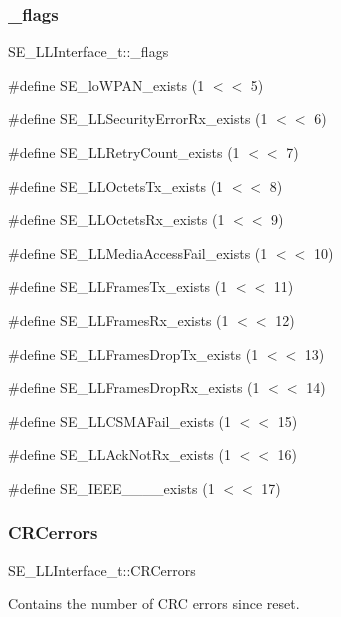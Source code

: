 \subsubsection{\texorpdfstring{\+\_\+flags}{\_flags}}
{\footnotesize\ttfamily S\+E\+\_\+\+L\+L\+Interface\+\_\+t\+::\+\_\+flags}

\#define S\+E\+\_\+lo\+W\+P\+A\+N\+\_\+exists (1 $<$$<$ 5)

\#define S\+E\+\_\+\+L\+L\+Security\+Error\+Rx\+\_\+exists (1 $<$$<$ 6)

\#define S\+E\+\_\+\+L\+L\+Retry\+Count\+\_\+exists (1 $<$$<$ 7)

\#define S\+E\+\_\+\+L\+L\+Octets\+Tx\+\_\+exists (1 $<$$<$ 8)

\#define S\+E\+\_\+\+L\+L\+Octets\+Rx\+\_\+exists (1 $<$$<$ 9)

\#define S\+E\+\_\+\+L\+L\+Media\+Access\+Fail\+\_\+exists (1 $<$$<$ 10)

\#define S\+E\+\_\+\+L\+L\+Frames\+Tx\+\_\+exists (1 $<$$<$ 11)

\#define S\+E\+\_\+\+L\+L\+Frames\+Rx\+\_\+exists (1 $<$$<$ 12)

\#define S\+E\+\_\+\+L\+L\+Frames\+Drop\+Tx\+\_\+exists (1 $<$$<$ 13)

\#define S\+E\+\_\+\+L\+L\+Frames\+Drop\+Rx\+\_\+exists (1 $<$$<$ 14)

\#define S\+E\+\_\+\+L\+L\+C\+S\+M\+A\+Fail\+\_\+exists (1 $<$$<$ 15)

\#define S\+E\+\_\+\+L\+L\+Ack\+Not\+Rx\+\_\+exists (1 $<$$<$ 16)

\#define S\+E\+\_\+\+I\+E\+E\+E\+\_\+\_\+\_\+\_\+exists (1 $<$$<$ 17) \mbox{\label{group__LLInterface_gae30861c0bcee76e4fb3d6595c0627ee4}} 
\subsubsection{\texorpdfstring{C\+R\+Cerrors}{CRCerrors}}
{\footnotesize\ttfamily S\+E\+\_\+\+L\+L\+Interface\+\_\+t\+::\+C\+R\+Cerrors}

Contains the number of C\+RC errors since reset. \mbox{\label{group__LLInterface_ga04a90ef4163eeb75c14b51dc355c230b}} 
